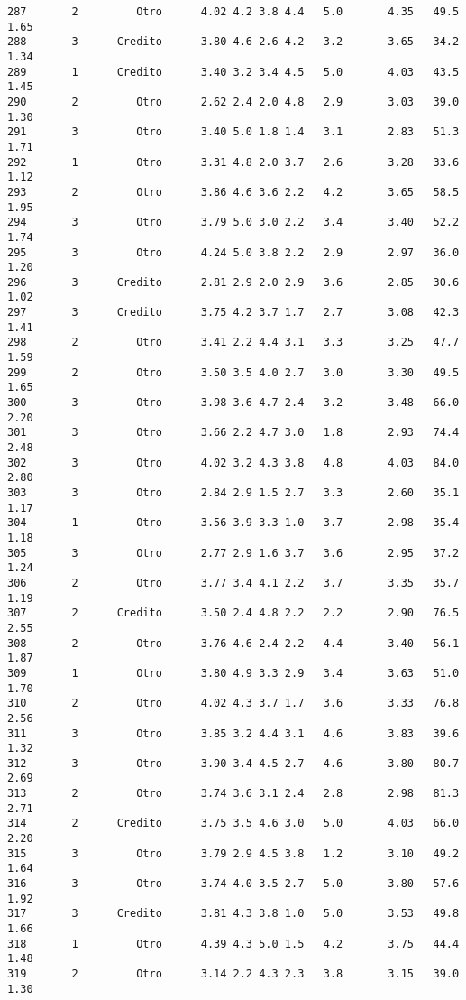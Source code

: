 \documentclass[
  letterpaper,
  DIV=11,
  numbers=noendperiod]{scrartcl}
\begin{document}
\begin{verbatim}
287       2         Otro      4.02 4.2 3.8 4.4   5.0       4.35   49.5    1.65
288       3      Credito      3.80 4.6 2.6 4.2   3.2       3.65   34.2    1.34
289       1      Credito      3.40 3.2 3.4 4.5   5.0       4.03   43.5    1.45
290       2         Otro      2.62 2.4 2.0 4.8   2.9       3.03   39.0    1.30
291       3         Otro      3.40 5.0 1.8 1.4   3.1       2.83   51.3    1.71
292       1         Otro      3.31 4.8 2.0 3.7   2.6       3.28   33.6    1.12
293       2         Otro      3.86 4.6 3.6 2.2   4.2       3.65   58.5    1.95
294       3         Otro      3.79 5.0 3.0 2.2   3.4       3.40   52.2    1.74
295       3         Otro      4.24 5.0 3.8 2.2   2.9       2.97   36.0    1.20
296       3      Credito      2.81 2.9 2.0 2.9   3.6       2.85   30.6    1.02
297       3      Credito      3.75 4.2 3.7 1.7   2.7       3.08   42.3    1.41
298       2         Otro      3.41 2.2 4.4 3.1   3.3       3.25   47.7    1.59
299       2         Otro      3.50 3.5 4.0 2.7   3.0       3.30   49.5    1.65
300       3         Otro      3.98 3.6 4.7 2.4   3.2       3.48   66.0    2.20
301       3         Otro      3.66 2.2 4.7 3.0   1.8       2.93   74.4    2.48
302       3         Otro      4.02 3.2 4.3 3.8   4.8       4.03   84.0    2.80
303       3         Otro      2.84 2.9 1.5 2.7   3.3       2.60   35.1    1.17
304       1         Otro      3.56 3.9 3.3 1.0   3.7       2.98   35.4    1.18
305       3         Otro      2.77 2.9 1.6 3.7   3.6       2.95   37.2    1.24
306       2         Otro      3.77 3.4 4.1 2.2   3.7       3.35   35.7    1.19
307       2      Credito      3.50 2.4 4.8 2.2   2.2       2.90   76.5    2.55
308       2         Otro      3.76 4.6 2.4 2.2   4.4       3.40   56.1    1.87
309       1         Otro      3.80 4.9 3.3 2.9   3.4       3.63   51.0    1.70
310       2         Otro      4.02 4.3 3.7 1.7   3.6       3.33   76.8    2.56
311       3         Otro      3.85 3.2 4.4 3.1   4.6       3.83   39.6    1.32
312       3         Otro      3.90 3.4 4.5 2.7   4.6       3.80   80.7    2.69
313       2         Otro      3.74 3.6 3.1 2.4   2.8       2.98   81.3    2.71
314       2      Credito      3.75 3.5 4.6 3.0   5.0       4.03   66.0    2.20
315       3         Otro      3.79 2.9 4.5 3.8   1.2       3.10   49.2    1.64
316       3         Otro      3.74 4.0 3.5 2.7   5.0       3.80   57.6    1.92
317       3      Credito      3.81 4.3 3.8 1.0   5.0       3.53   49.8    1.66
318       1         Otro      4.39 4.3 5.0 1.5   4.2       3.75   44.4    1.48
319       2         Otro      3.14 2.2 4.3 2.3   3.8       3.15   39.0    1.30

\end{verbatim}
\end{document}
